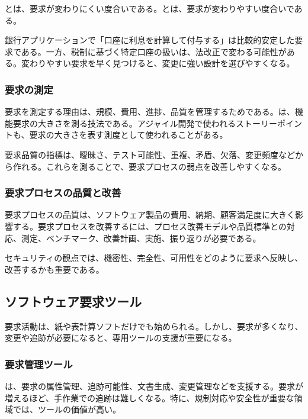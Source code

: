 \documentclass[a4paper,11pt]{ltjsarticle}
\numberwithin{figure}{section}
\numberwithin{table}{section}
\begin{document}
とは、要求が変わりにくい度合いである。とは、要求が変わりやすい度合いである。

銀行アプリケーションで「口座に利息を計算して付与する」は比較的安定した要求である。一方、税制に基づく特定口座の扱いは、法改正で変わる可能性がある。変わりやすい要求を早く見つけると、変更に強い設計を選びやすくなる。

\subsubsection{要求の測定}

要求を測定する理由は、規模、費用、進捗、品質を管理するためである。は、機能要求の大きさを測る技法である。アジャイル開発で使われるストーリーポイントも、要求の大きさを表す測度として使われることがある。

要求品質の指標は、曖昧さ、テスト可能性、重複、矛盾、欠落、変更頻度などから作れる。これらを測ることで、要求プロセスの弱点を改善しやすくなる。

\subsubsection{要求プロセスの品質と改善}

要求プロセスの品質は、ソフトウェア製品の費用、納期、顧客満足度に大きく影響する。要求プロセスを改善するには、プロセス改善モデルや品質標準との対応、測定、ベンチマーク、改善計画、実施、振り返りが必要である。

セキュリティの観点では、機密性、完全性、可用性をどのように要求へ反映し、改善するかも重要である。

\subsection{ソフトウェア要求ツール}

要求活動は、紙や表計算ソフトだけでも始められる。しかし、要求が多くなり、変更や追跡が必要になると、専用ツールの支援が重要になる。

\subsubsection{要求管理ツール}

は、要求の属性管理、追跡可能性、文書生成、変更管理などを支援する。要求が増えるほど、手作業での追跡は難しくなる。特に、規制対応や安全性が重要な領域では、ツールの価値が高い。
\end{document}
